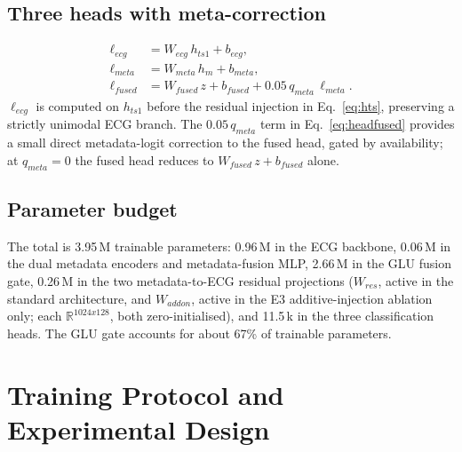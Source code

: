 \documentclass[mathematics,article,submit,pdftex]{Definitions/mdpi}
\def\mathrm#1{#1}%
\def\mathbf#1{#1}%
\def\emph#1{#1}%
\def\bm#1{#1}%
\def\times{x}%
\begin{document}
\subsection{Three heads with meta-correction}
\begin{align}
\bm{\ell}_{\mathrm{ecg}}   &= \mathbf{W}_{\mathrm{ecg}}\,\mathbf{h}_{\mathrm{ts1}} + \mathbf{b}_{\mathrm{ecg}}, \\
\bm{\ell}_{\mathrm{meta}}  &= \mathbf{W}_{\mathrm{meta}}\,\mathbf{h}_{\mathrm{m}} + \mathbf{b}_{\mathrm{meta}}, \\
\bm{\ell}_{\mathrm{fused}} &= \mathbf{W}_{\mathrm{fused}}\,\mathbf{z} + \mathbf{b}_{\mathrm{fused}} + 0.05\,q_{\mathrm{meta}}\,\bm{\ell}_{\mathrm{meta}}. \label{eq:headfused}
\end{align}
$\bm{\ell}_{\mathrm{ecg}}$ is computed on $\mathbf{h}_{\mathrm{ts1}}$ \emph{before} the residual injection in Eq.~\eqref{eq:hts}, preserving a strictly unimodal ECG branch. The $0.05\,q_{\mathrm{meta}}$ term in Eq.~\eqref{eq:headfused} provides a small direct metadata-logit correction to the fused head, gated by availability; at $q_{\mathrm{meta}}{=}0$ the fused head reduces to $\mathbf{W}_{\mathrm{fused}}\,\mathbf{z}+\mathbf{b}_{\mathrm{fused}}$ alone.

\subsection{Parameter budget}
The total is 3.95\,M trainable parameters: 0.96\,M in the ECG backbone, 0.06\,M in the dual metadata encoders and metadata-fusion MLP, 2.66\,M in the GLU fusion gate, 0.26\,M in the two metadata-to-ECG residual projections ($\mathbf{W}_{\mathrm{res}}$, active in the standard architecture, and $\mathbf{W}_{\mathrm{addon}}$, active in the E3 additive-injection ablation only; each $\mathbb{R}^{1024\times128}$, both zero-initialised), and 11.5\,k in the three classification heads. The GLU gate accounts for about 67\% of trainable parameters.

\section{Training Protocol and Experimental Design}\label{sec:protocol}
\end{document}
